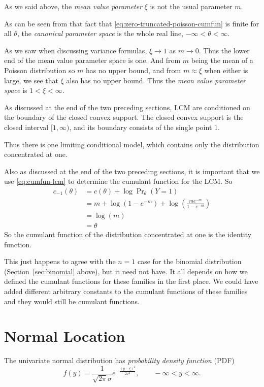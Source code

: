 As we said above, the \emph{mean value parameter} $\xi$ is not
the usual parameter $m$.

As can be seen from that fact that \eqref{eq:zero-truncated-poisson-cumfun}
is finite for all $\theta$,
the \emph{canonical parameter space} is
the whole real line, $- \infty < \theta < \infty$.

As we saw when discussing variance formulas, $\xi \to 1$ as $m \to 0$.
Thus the lower end of the mean value parameter space is one.
And from $m$ being the mean of a Poisson distribution so $m$ has
no upper bound, and from $m \approx \xi$ when either is large, we see that
$\xi$ also has no upper bound.  Thus
the \emph{mean value parameter space} is $1 < \xi < \infty$.

As discussed at the end of the two preceding sections, LCM
are conditioned on the boundary of the closed convex support.
The closed convex support is the closed interval $[1, \infty)$, and its
boundary consists of the single point $1$.

Thus there is one limiting conditional model, which contains only
the distribution concentrated at one.

Also as discussed at the end of the two preceding sections,
it is important that we use \eqref{eq:cumfun-lcm} to determine the cumulant
function for the LCM.  So
\begin{align*}
   c_{- 1}(\theta)
   & =
   c(\theta) + \log \Pr\nolimits_\theta(Y = 1)
   \\
   & =
   m + \log(1 - e^{- m})
   +
   \log \left(\frac{m e^{- m}}{1 - e^{- m}}\right)
   \\
   & =
   \log(m)
   \\
   & =
   \theta
\end{align*}
So the cumulant function of the distribution concentrated at one is the
identity function.

This just happens to agree with the $n = 1$ case for the binomial
distribution (Section~\ref{sec:binomial} above), but it need not have.
It all depends on how we defined the cumulant functions for these families
in the first place.  We could have added different arbitrary constants
to the cumulant functions of these families and they would still be
cumulant functions.

\section{Normal Location}

\begin{sloppypar}
The univariate normal distribution has \emph{probability density function}
(PDF)
\begin{equation} \label{eq:normal-pdf}
   f(y) = \frac{1}{\sqrt{2 \pi} \sigma} e^{- \frac{(y - \xi)^2}{2 \sigma^2}},
   \qquad - \infty < y < \infty.
\end{equation}
\end{sloppypar}

